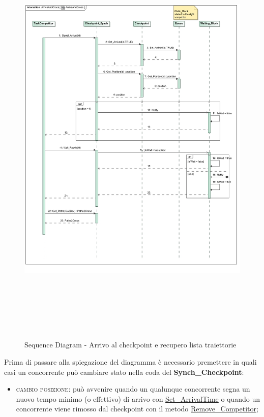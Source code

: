 \begin{description}
\begin{center}
\begin{figure}[h!]
\advance\leftskip-2.2cm
	\includegraphics[scale=0.50,height=20cm]{img/SequenceDiagrams/ArriveAndCross.jpg}
	\label{arriveAndCross}
\caption{Sequence Diagram - Arrivo al checkpoint e recupero lista traiettorie}
\end{figure}
\end{center}
\clearpage
Prima di passare alla spiegazione del diagramma \`{e} necessario premettere in quali casi un concorrente pu\`{o} cambiare stato nella coda del \textbf{Synch\_Checkpoint}:
\begin{itemize}
\item \textsc{cambio posizione}: pu\`{o} avvenire quando un qualunque concorrente segna un nuovo tempo minimo (o effettivo) 
di arrivo con \underline{Set\_ArrivalTime} o quando un concorrente viene rimosso dal checkpoint con il metodo \underline{Remove\_Competitor};

\end{itemize}
\end{description}
